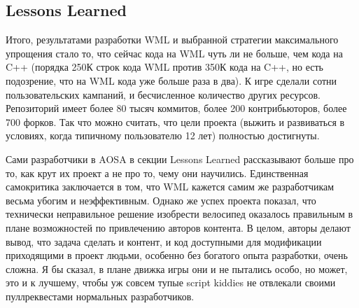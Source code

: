 \documentclass[a5paper]{article}
\begin{document}
\subsection{Lessons Learned}

Итого, результатами разработки WML и выбранной стратегии максимального упрощения стало то, что сейчас кода на WML чуть ли не больше, чем кода на C++ (порядка 250К строк кода WML против 350К кода на C++, но есть подозрение, что на WML кода уже больше раза в два). К игре сделали сотни пользовательских кампаний, и бесчисленное количество других ресурсов. Репозиторий имеет более 80 тысяч коммитов, более 200 контрибьюторов, более 700 форков. Так что можно считать, что цели проекта (выжить и развиваться в условиях, когда типичному пользователю 12 лет) полностью достигнуты. 

Сами разработчики в AOSA в секции Lessons Learned рассказывают больше про то, как крут их проект а не про то, чему они научились. Единственная самокритика заключается в том, что WML кажется самим же разработчикам весьма убогим и неэффективным. Однако же успех проекта показал, что технически неправильное решение изобрести велосипед оказалось правильным в плане возможностей по привлечению авторов контента. В целом, авторы делают вывод, что задача сделать и контент, и код доступными для модификации приходящими в проект людьми, особенно без богатого опыта разработки, очень сложна. Я бы сказал, в плане движка игры они и не пытались особо, но может, это и к лучшему, чтобы уж совсем тупые script kiddies не отвлекали своими пуллреквестами нормальных разработчиков.
\end{document}
